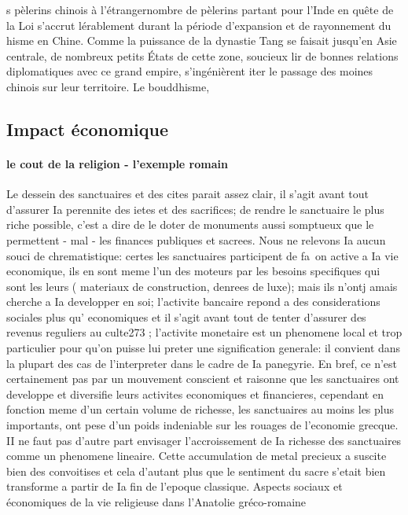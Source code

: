 s pèlerins chinois à l'étrangernombre de pèlerins partant pour l'Inde en quête de la Loi s'accrut lérablement durant la période d'expansion et de rayonnement du hisme en Chine. Comme la puissance de la dynastie Tang se faisait jusqu'en Asie centrale, de nombreux petits États de cette zone, soucieux lir de bonnes relations diplomatiques avec ce grand empire, s'ingénièrent iter le passage des moines chinois sur leur territoire. Le bouddhisme,
\cite[p. 233-239]{chen_histoire_2015}

\subsection{Impact économique}


\paragraph{le cout de la religion - l'exemple romain}
\begin{singlequote}
    Le dessein des sanctuaires et des cites parait assez clair, il s'agit
avant tout d'assurer Ia perennite des ietes et des sacrifices; de rendre
le sanctuaire le plus riche possible, c'est a dire de le doter de
monuments aussi somptueux que le permettent - mal - les finances
publiques et sacrees. Nous ne relevons Ia aucun souci de chrematistique:
certes les sanctuaires participent de fa~on active a Ia vie
economique, ils en sont meme l'un des moteurs par les besoins specifiques
qui sont les leurs ( materiaux de construction, denrees de
luxe); mais ils n'ontj amais cherche a Ia developper en soi; l'activite
bancaire repond a des considerations sociales plus qu' economiques
et il s'agit avant tout de tenter d'assurer des revenus reguliers au
culte273 ; l'activite monetaire est un phenomene local et trop particulier
pour qu'on puisse lui preter une signification generale: il
convient dans la plupart des cas de l'interpreter dans le cadre de Ia
panegyrie. En bref, ce n'est certainement pas par un mouvement
conscient et raisonne que les sanctuaires ont developpe et diversifie
leurs activites economiques et financieres, cependant en fonction
meme d'un certain volume de richesse, les sanctuaires au moins les
plus importants, ont pese d'un poids indeniable sur les rouages de
l'economie grecque. II ne faut pas d'autre part envisager l'accroissement
de Ia richesse des sanctuaires comme un phenomene
lineaire. Cette accumulation de metal precieux a suscite bien des
convoitises et cela d'autant plus que le sentiment du sacre s'etait
bien transforme a partir de Ia fin de l'epoque classique.
Aspects sociaux et économiques de la vie religieuse dans l'Anatolie gréco-romaine \cite{debord_aspects_1982}
\end{singlequote}
 

